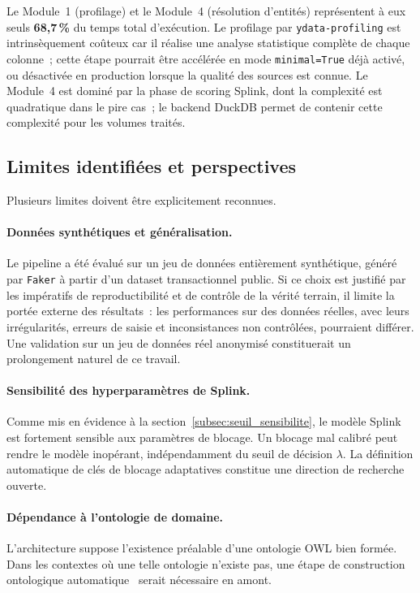 \noindent Le Module~1 (profilage) et le Module~4 (résolution d'entités)
représentent à eux seuls \textbf{68,7\,\%} du temps total
d'exécution. Le profilage par \texttt{ydata-profiling} est
intrinsèquement coûteux car il réalise une analyse statistique
complète de chaque colonne~; cette étape pourrait être accélérée en
mode \texttt{minimal=True} déjà activé, ou désactivée en production
lorsque la qualité des sources est connue. Le Module~4 est dominé par
la phase de scoring Splink, dont la complexité est quadratique dans le
pire cas~; le backend DuckDB permet de contenir cette complexité
pour les volumes traités.

\subsection{Limites identifiées et perspectives}
\label{subsec:limites}

Plusieurs limites doivent être explicitement reconnues.

\paragraph{Données synthétiques et généralisation.}
Le pipeline a été évalué sur un jeu de données entièrement synthétique,
généré par \texttt{Faker} à partir d'un dataset transactionnel public.
Si ce choix est justifié par les impératifs de reproductibilité et de
contrôle de la vérité terrain, il limite la portée externe des
résultats~: les performances sur des données réelles, avec leurs
irrégularités, erreurs de saisie et inconsistances non contrôlées,
pourraient différer. Une validation sur un jeu de données réel
anonymisé constituerait un prolongement naturel de ce travail.

\paragraph{Sensibilité des hyperparamètres de Splink.}
Comme mis en évidence à la section~\ref{subsec:seuil_sensibilite},
le modèle Splink est fortement sensible aux paramètres de blocage.
Un blocage mal calibré peut rendre le modèle inopérant, indépendamment
du seuil de décision $\lambda$. La définition automatique de clés de
blocage adaptatives constitue une direction de recherche ouverte.

\paragraph{Dépendance à l'ontologie de domaine.}
L'architecture suppose l'existence préalable d'une ontologie OWL bien
formée. Dans les contextes où une telle ontologie n'existe pas, une
étape de construction ontologique automatique~\cite{nuzzolese2021}
serait nécessaire en amont.

